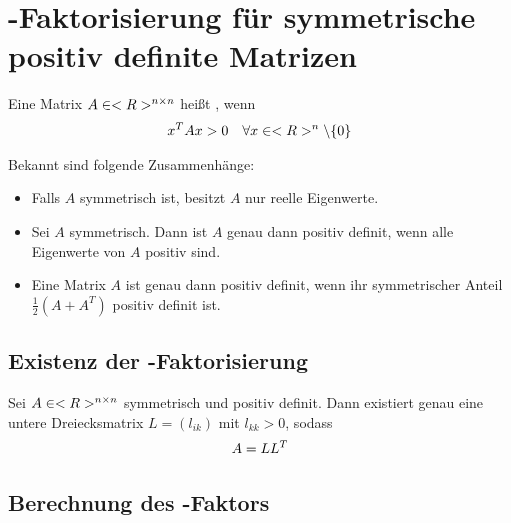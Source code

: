 \section{-Faktorisierung für symmetrische positiv definite Matrizen}

\begin{definition}
	Eine Matrix $A\in<R>^{n\times n}$ heißt , wenn
	\begin{align}
		x^TAx>0\quad\forall x\in<R>^n\backslash\{0\}\notag
	\end{align}
\end{definition}

Bekannt sind folgende Zusammenhänge:
\begin{itemize}
	\item Falls $A$ symmetrisch ist, besitzt $A$ nur reelle Eigenwerte.
	\item Sei $A$ symmetrisch. Dann ist $A$ genau dann positiv definit, wenn alle Eigenwerte von $A$ positiv sind.
	\item Eine Matrix $A$ ist genau dann positiv definit, wenn ihr symmetrischer Anteil $\frac{1}{2}(A+A^T)$ positiv definit ist.
\end{itemize}

\subsection{Existenz der -Faktorisierung}

\begin{proposition}
	Sei $A\in<R>^{n\times n}$ symmetrisch und positiv definit. Dann existiert genau eine untere Dreiecksmatrix $L=(l_{ik})$ mit $l_{kk}>0$, sodass
	\begin{align}
		A=LL^T\notag
	\end{align}
\end{proposition}

\subsection{Berechnung des -Faktors}